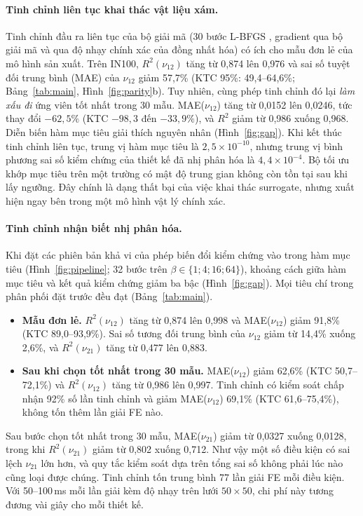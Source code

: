 \documentclass[a4paper,11pt]{article}
\newcommand{\nuot}{\nu_{12}}
\newcommand{\nuto}{\nu_{21}}
\newcommand{\RR}{R^2}
\begin{document}
\paragraph{Tinh chỉnh liên tục khai thác vật liệu xám.}
Tinh chỉnh đầu ra liên tục của bộ giải mã (30 bước L-BFGS
\citep{liu1989lbfgs}, gradient qua bộ giải mã và qua độ nhạy chính xác của
đồng nhất hóa) có ích cho mẫu đơn lẻ của mô hình sản xuất. Trên IN100,
$\RR(\nuot)$ tăng từ 0,874 lên 0,976 và sai số tuyệt đối trung bình (MAE)
của $\nuot$ giảm 57,7\% (KTC 95\%: 49,4--64,6\%; Bảng~\ref{tab:main},
Hình~\ref{fig:parity}b). Tuy nhiên, cùng phép tinh chỉnh đó lại \emph{làm
xấu đi} ứng viên tốt nhất trong 30 mẫu. MAE($\nuot$) tăng từ 0,0152 lên
0,0246, tức thay đổi $-62{,}5\%$ (KTC $-98{,}3$ đến $-33{,}9\%$), và $\RR$
giảm từ 0,986 xuống 0,968. Diễn biến hàm mục tiêu giải thích nguyên nhân
(Hình~\ref{fig:gap}). Khi kết thúc tinh chỉnh liên tục, trung vị hàm mục
tiêu là $2{,}5\times10^{-10}$, nhưng trung vị bình phương sai số kiểm chứng
của thiết kế đã nhị phân hóa là $4{,}4\times10^{-4}$. Bộ tối ưu khớp mục
tiêu trên một trường có mật độ trung gian không còn tồn tại sau khi lấy
ngưỡng. Đây chính là dạng thất bại của việc khai thác surrogate, nhưng xuất
hiện ngay bên trong một mô hình vật lý chính xác.

\paragraph{Tinh chỉnh nhận biết nhị phân hóa.}
Khi đặt các phiên bản khả vi của phép biến đổi kiểm chứng vào trong hàm mục
tiêu (Hình~\ref{fig:pipeline}; 32 bước trên $\beta\in\{1;4;16;64\}$), khoảng
cách giữa hàm mục tiêu và kết quả kiểm chứng giảm ba bậc
(Hình~\ref{fig:gap}). Mọi tiêu chí trong phân phối đặt trước đều đạt
(Bảng~\ref{tab:main}).
\begin{itemize}
\item \textbf{Mẫu đơn lẻ.} $\RR(\nuot)$ tăng từ 0,874 lên 0,998 và
MAE($\nuot$) giảm 91,8\% (KTC 89,0--93,9\%). Sai số tương đối trung bình của
$\nuot$ giảm từ 14,4\% xuống 2,6\%, và $\RR(\nuto)$ tăng từ 0,477 lên 0,883.
\item \textbf{Sau khi chọn tốt nhất trong 30 mẫu.} MAE($\nuot$) giảm 62,6\%
(KTC 50,7--72,1\%) và $\RR(\nuot)$ tăng từ 0,986 lên 0,997. Tinh chỉnh có
kiểm soát chấp nhận 92\% số lần tinh chỉnh và giảm MAE($\nuot$) 69,1\% (KTC
61,6--75,4\%), không tốn thêm lần giải FE nào.
\end{itemize}
Sau bước chọn tốt nhất trong 30 mẫu, MAE($\nuto$) giảm từ 0,0327 xuống
0,0128, trong khi $\RR(\nuto)$ giảm từ 0,802 xuống 0,712. Như vậy một số điều
kiện có sai lệch $\nuto$ lớn hơn, và quy tắc kiểm soát dựa trên tổng sai số
không phải lúc nào cũng loại được chúng. Tinh chỉnh tốn trung bình 77 lần
giải FE mỗi điều kiện. Với 50--100\,ms mỗi lần giải kèm độ nhạy trên lưới
$50\times50$, chi phí này tương đương vài giây cho mỗi thiết kế.
\end{document}
